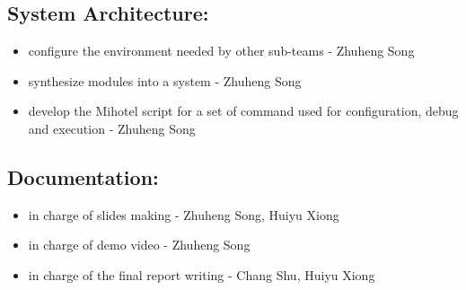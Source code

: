 \subsection*{System Architecture:}
\begin{itemize}
    \item configure the environment needed by other sub-teams - Zhuheng Song
    \item synthesize modules into a system - Zhuheng Song
    \item develop the Mihotel script for a set of command used for configuration, debug and execution - Zhuheng Song
\end{itemize}

\subsection*{Documentation:}
\begin{itemize}
    \item in charge of slides making - Zhuheng Song, Huiyu Xiong
    \item in charge of demo video - Zhuheng Song
    \item in charge of the final report writing - Chang Shu, Huiyu Xiong
\end{itemize}